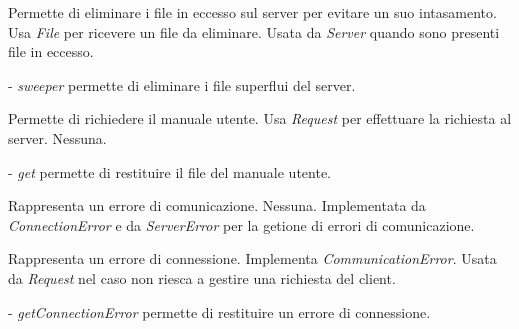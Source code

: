 Permette di eliminare i file in eccesso sul server per evitare un suo intasamento.
Usa \textit{File} per ricevere un file da eliminare.
Usata da \textit{Server} quando sono presenti file in eccesso.
\begin{elencopuntato}[\normindent]
\item[-] \textit{sweeper} permette di eliminare i file superflui del server.
\end{elencopuntato}

Permette di richiedere il manuale utente.
Usa \textit{Request} per effettuare la richiesta al server.
Nessuna.
\begin{elencopuntato}[\normindent]
\item[-] \textit{get} permette di restituire il file del manuale utente.
\end{elencopuntato}

Rappresenta un errore di comunicazione.
Nessuna.
Implementata da \textit{ConnectionError} e da \textit{ServerError} per la getione di errori di comunicazione.

Rappresenta un errore di connessione.
Implementa \textit{CommunicationError}.
Usata da \textit{Request} nel caso non riesca a gestire una richiesta del client.
\begin{elencopuntato}[\normindent]
\item[-] \textit{getConnectionError} permette di restituire un errore di connessione.
\end{elencopuntato}

